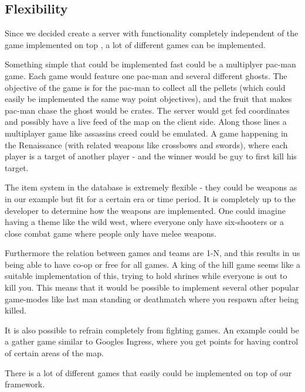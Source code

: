 \subsection{Flexibility}\label{subsec:flex}
Since we decided create a server with functionality completely independent of the game implemented on top , a lot of different games can be implemented. 

Something simple that could be implemented fast could be a multiplyer pac-man game. Each game would feature one pac-man and several different ghosts. The objective of the game is for the pac-man to collect all the pellets (which could easily be implemented the same way point objectives), and the fruit that makes pac-man chase the ghost would be crates. The server would get fed coordinates and possibly have a live feed of the map on the client side.
Along those lines a multiplayer game like assassins creed could be emulated. A game happening in the Renaissance (with related weapons like crossbows and swords), where each player is a target of another player - and the winner would be guy to first kill his target.

The item system in the database is extremely flexible - they could be weapons as in our example but fit for a certain era or time period. It is completely up to the developer to determine how the weapons are implemented. One could imagine having a theme like the wild west, where everyone only have six-shooters or a close combat game where people only have melee weapons. 

Furthermore the relation between games and teams are 1-N, and this results in us being able to have co-op or free for all games. A king of the hill game seems like a suitable implementation of this, trying to hold shrines while everyone is out to kill you. This means that it would be possible to implement several other popular game-modes like last man standing or deathmatch where you respawn after being killed.

It is also possible to refrain completely from fighting games. An example could be a gather game similar to Googles Ingress, where you get points for having control of certain areas of the map.

There is a lot of different games that easily could be implemented on top of our framework.



